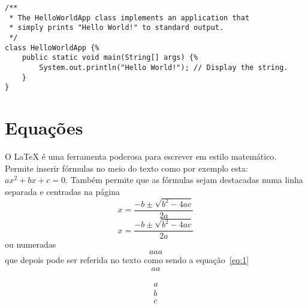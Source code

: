 \lstset{language=Java, caption=Hello World, label=lst:HelloWorld}
\begin{lstlisting}
/** 
 * The HelloWorldApp class implements an application that
 * simply prints "Hello World!" to standard output.
 */
class HelloWorldApp {%
    public static void main(String[] args) {%
        System.out.println("Hello World!"); // Display the string.
    }
}
\end{lstlisting}

\section{Equações}

O LaTeX é uma ferramenta poderosa para escrever em estilo matemático. Permite inserir fórmulas no meio do texto como por exemplo esta: $ax^2 + bx + c = 0$. Também permite que as fórmulas sejam destacadas numa linha separada e centradas na página 
$$x = \frac{-b \pm \sqrt{b^2-4ac}}{2a}$$
\[x = \frac{-b \pm \sqrt{b^2-4ac}}{2a}\]
ou numeradas 
\begin{equation}
aaa
\label{eq:1}
\end{equation}
que depois pode ser referida no texto como sendo a equação~\ref{eq:1}
$$\begin{array}{l}
aa
\end{array}
$$

\begin{eqnarray}
a\\
b\\
c\\
\end{eqnarray}


